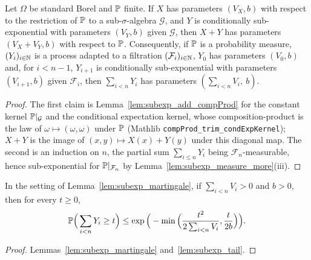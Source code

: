 \begin{lemma}\label{lem:subexp_martingale}
\leanok
{}
Let $\Omega$ be standard Borel and $\mathbb{P}$ finite. If $X$ has parameters $(V_X, b)$ with
respect to the restriction of $\mathbb{P}$ to a sub-$\sigma$-algebra $\mathcal G$, and $Y$ is
conditionally sub-exponential with parameters $(V_Y, b)$ given $\mathcal G$, then $X + Y$ has
parameters $(V_X + V_Y, b)$ with respect to $\mathbb{P}$. Consequently, if $\mathbb{P}$ is a probability
measure, $(Y_i)_{i\in\mathbb{N}}$ is a process adapted to a filtration $(\mathcal F_i)_{i\in\mathbb{N}}$,
$Y_0$ has parameters $(V_0, b)$ and, for $i < n-1$, $Y_{i+1}$ is conditionally
sub-exponential with parameters $(V_{i+1}, b)$ given $\mathcal F_i$, then
$\sum_{i<n}Y_i$ has parameters $(\sum_{i<n}V_i,\ b)$.
\end{lemma}

\begin{proof}
\leanok
{}
The first claim is Lemma~\ref{lem:subexp_add_compProd} for the constant kernel
$\mathbb{P}|_{\mathcal G}$ and the conditional expectation kernel, whose composition-product is
the law of $\omega\mapsto(\omega,\omega)$ under $\mathbb{P}$ (Mathlib
\texttt{compProd\_trim\_condExpKernel}); $X + Y$ is the image of $(x,y)\mapsto X(x)+Y(y)$
under this diagonal map. The second is an induction on $n$, the partial sum
$\sum_{i\le n}Y_i$ being $\mathcal F_n$-measurable, hence sub-exponential for
$\mathbb{P}|_{\mathcal F_n}$ by Lemma~\ref{lem:subexp_measure_more}(iii).
\end{proof}

\begin{lemma}\label{lem:azuma_bernstein}
\leanok
{}
In the setting of Lemma~\ref{lem:subexp_martingale}, if $\sum_{i<n}V_i > 0$ and $b > 0$, then
for every $t \ge 0$,
\[
  \mathbb{P}\Big(\sum_{i<n}Y_i \ge t\Big)
  \le \exp\Big(-\min\Big(\frac{t^2}{2\sum_{i<n}V_i}, \frac{t}{2b}\Big)\Big).
\]
\end{lemma}

\begin{proof}
\leanok
{}
Lemmas~\ref{lem:subexp_martingale} and~\ref{lem:subexp_tail}.
\end{proof}

